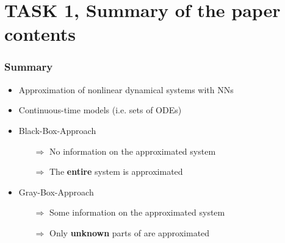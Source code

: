 \section{TASK 1, Summary of the paper contents}

\begin{frame}
	\frametitle{Summary}
	\begin{itemize}
		\item Approximation of nonlinear dynamical systems with NNs
		\item Continuous-time models (i.e. sets of ODEs)
		\item Black-Box-Approach
		\begin{itemize}
			\item[$\Rightarrow$] No information on the approximated system
			\item[$\Rightarrow$] The \textbf{entire} system is approximated
		\end{itemize}
		\item Gray-Box-Approach
		\begin{itemize}
			\item[$\Rightarrow$] Some information on the approximated system
			\item[$\Rightarrow$] Only \textbf{unknown} parts of are approximated
		\end{itemize}
	\end{itemize}
\end{frame}

